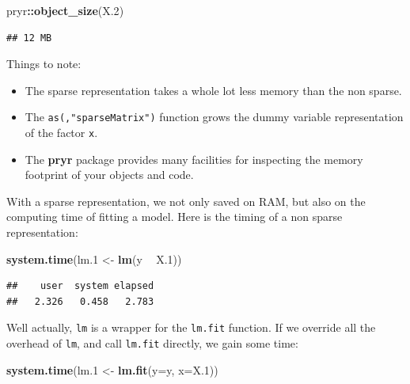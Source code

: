 \documentclass[]{book}
\newenvironment{Shaded}{\begin{snugshade}}{\end{snugshade}}
\newcommand{\DataTypeTok}[1]{\textcolor[rgb]{0.13,0.29,0.53}{#1}}
\newcommand{\FloatTok}[1]{\textcolor[rgb]{0.00,0.00,0.81}{#1}}
\newcommand{\KeywordTok}[1]{\textcolor[rgb]{0.13,0.29,0.53}{\textbf{#1}}}
\newcommand{\NormalTok}[1]{#1}
\newcommand{\OperatorTok}[1]{\textcolor[rgb]{0.81,0.36,0.00}{\textbf{#1}}}
\newcommand{\StringTok}[1]{\textcolor[rgb]{0.31,0.60,0.02}{#1}}
\providecommand{\tightlist}{%
  \setlength{\itemsep}{0pt}\setlength{\parskip}{0pt}}
\theoremstyle{definition}
\theoremstyle{definition}
\theoremstyle{definition}
\theoremstyle{remark}
\begin{document}
\begin{Shaded}
\begin{Highlighting}[]
\NormalTok{pryr}\OperatorTok{::}\KeywordTok{object_size}\NormalTok{(X}\FloatTok{.2}\NormalTok{)}
\end{Highlighting}
\end{Shaded}

\begin{verbatim}
## 12 MB
\end{verbatim}

Things to note:

\begin{itemize}
\tightlist
\item
  The sparse representation takes a whole lot less memory than the non sparse.
\item
  The \texttt{as(,"sparseMatrix")} function grows the dummy variable representation of the factor \texttt{x}.
\item
  The \textbf{pryr} package provides many facilities for inspecting the memory footprint of your objects and code.
\end{itemize}

With a sparse representation, we not only saved on RAM, but also on the computing time of fitting a model.
Here is the timing of a non sparse representation:

\begin{Shaded}
\begin{Highlighting}[]
\KeywordTok{system.time}\NormalTok{(lm}\FloatTok{.1}\NormalTok{ <-}\StringTok{ }\KeywordTok{lm}\NormalTok{(y }\OperatorTok{~}\StringTok{ }\NormalTok{X}\FloatTok{.1}\NormalTok{)) }
\end{Highlighting}
\end{Shaded}

\begin{verbatim}
##    user  system elapsed 
##   2.326   0.458   2.783
\end{verbatim}

Well actually, \texttt{lm} is a wrapper for the \texttt{lm.fit} function.
If we override all the overhead of \texttt{lm}, and call \texttt{lm.fit} directly, we gain some time:

\begin{Shaded}
\begin{Highlighting}[]
\KeywordTok{system.time}\NormalTok{(lm}\FloatTok{.1}\NormalTok{ <-}\StringTok{ }\KeywordTok{lm.fit}\NormalTok{(}\DataTypeTok{y=}\NormalTok{y, }\DataTypeTok{x=}\NormalTok{X}\FloatTok{.1}\NormalTok{))}
\end{Highlighting}
\end{Shaded}
\end{document}
